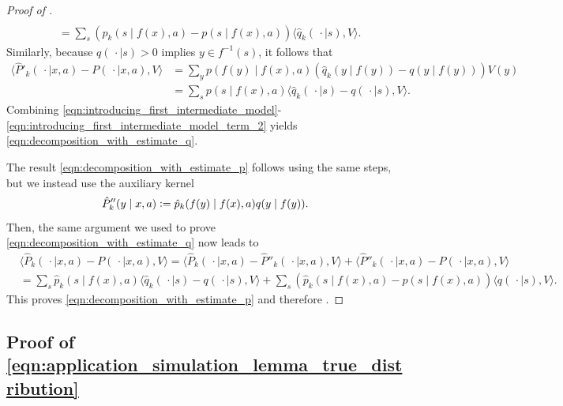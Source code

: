 \documentclass[11pt]{article}
\newcommand{\eqdef}{\vcentcolon=}
\theoremstyle{definition}
\theoremstyle{definition}
\begin{document}
\begin{proof}[Proof of ]
\begin{align}
		\nonumber
		\\
			&
		=
		\sum_{s}
		(\hat{p}_k(s\mid f(x),a)-p(s\mid f(x),a))\langle \hat{q}_k(\,\cdot \mid s),V\rangle
		.
	\end{align}
	Similarly, because $q(\,\cdot \mid s)>0$ implies $y\in f^{-1}(s)$, it follows that
	\begin{equation}
		\label{eqn:introducing_first_intermediate_model_term_2}
		\begin{split}
			\langle \hat{P}'_k(\,\cdot \mid x,a)-P(\,\cdot \mid x,a),V\rangle
			 &
			=
			\sum_{y}
			p(f(y)\mid f(x),a)(\hat{q}_k(y\mid f(y))-q(y\mid f(y)))V(y)
			\\
			 &
			=
			\sum_{s}
			p(s\mid f(x),a)\langle \hat{q}_k(\,\cdot \mid s)-q(\,\cdot \mid s),V\rangle.
		\end{split}
	\end{equation}
	Combining \eqref{eqn:introducing_first_intermediate_model}-\eqref{eqn:introducing_first_intermediate_model_term_2} yields \eqref{eqn:decomposition_with_estimate_q}.

	The result \eqref{eqn:decomposition_with_estimate_p} follows using the same steps, but we instead use the auxiliary kernel
	\begin{equation}
		\hat{P}''_k(y\mid x,a)\eqdef \hat{p}_k(f(y)\mid f(x),a)q(y\mid f(y)).
	\end{equation}
	Then, the same argument we used to prove \eqref{eqn:decomposition_with_estimate_q} now leads to
	\begin{equation}
		\begin{split}
			 &
			\langle \hat{P}_k(\,\cdot \mid x,a)-P(\,\cdot \mid x,a),V\rangle
			=
			\langle \hat{P}_k(\,\cdot \mid x,a)-\hat{P}''_k(\,\cdot \mid x,a),V\rangle
			+
			\langle \hat{P}''_k(\,\cdot \mid x,a)-P(\,\cdot \mid x,a),V\rangle
			\\
			 &
			=
			\sum_{s}
			\hat{p}_k(s\mid f(x),a)\langle \hat{q}_k(\,\cdot \mid s)-q(\,\cdot \mid s),V\rangle
			+
			\sum_{s}
			(\hat{p}_k(s\mid f(x),a)-p(s\mid f(x),a))\langle q(\,\cdot \mid s),V\rangle
			.
		\end{split}
	\end{equation}
	This proves \eqref{eqn:decomposition_with_estimate_p} and therefore .
\end{proof}

\subsection{Proof of \texorpdfstring{\eqref{eqn:application_simulation_lemma_true_distribution}}{the regret decomposition for the upper bound}}
\label{sec:proof_of_application_simulation_lemma_true_distribution}
\end{document}
